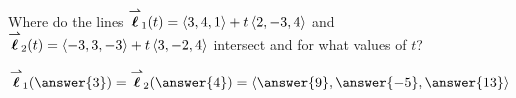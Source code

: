\documentclass{ximera}
\author{Gregory Hartman \and Matthew Carr}
\begin{document}
\begin{exercise}

Where do the lines ${\overset{\boldsymbol{\rightharpoonup}}{\mathbf{\boldsymbol{\ell}}}}_{1}(t)=\left\langle 3,4,1\right\rangle+t\left\langle 2,-3,4\right\rangle$ and ${\overset{\boldsymbol{\rightharpoonup}}{\mathbf{\boldsymbol{\ell}}}}_{2}(t)=\left\langle -3,3,-3\right\rangle+t\left\langle 3,-2,4\right\rangle$ intersect and for what values of $t$?

\begin{prompt}
\[
\vecl_{1}(\answer{3})=\vecl_{2}(\answer{4})=\vector{\answer{9},\answer{-5},\answer{13}}
\]
\end{prompt}

\end{exercise}
\end{document}
